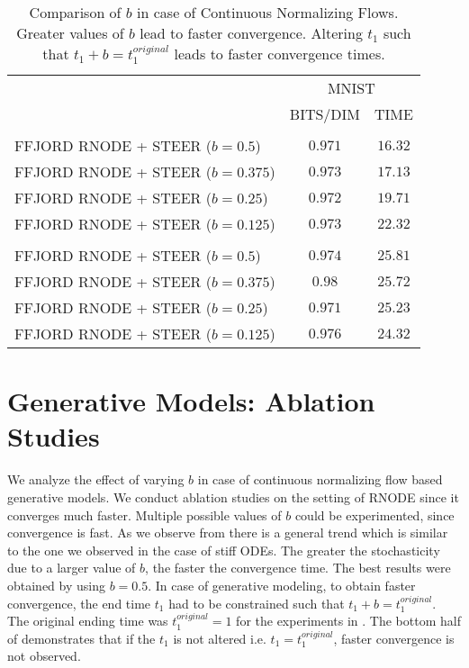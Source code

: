 \begin{table}[ht!]
	\centering
	\begin{tabular}{l c c }
		\toprule
		& \multicolumn{2}{c}{MNIST} \\
		& BITS/DIM & TIME \\
		\midrule
		\hdashline
		\multicolumn{3}{c}{$t_1:t_1+b=t_1^{original}=1$} \\
		\hdashline
		FFJORD RNODE + STEER ($b=0.5$) & $0.971$ & $16.32$ \\
		FFJORD RNODE + STEER ($b=0.375$) & $0.973$ & $17.13$  \\
		FFJORD RNODE + STEER ($b=0.25$) & $0.972$ & $19.71$  \\
		FFJORD RNODE + STEER ($b=0.125$) & $0.973$ & $22.32$  \\
		\hdashline
		\multicolumn{3}{c}{$t_1:t_1=t_1^{original}=1$} \\
		\hdashline
		FFJORD RNODE + STEER ($b=0.5$) & $0.974$ & $25.81$ \\
		FFJORD RNODE + STEER ($b=0.375$) & $0.98$ & $25.72$  \\
		FFJORD RNODE + STEER ($b=0.25$) & $0.971$ & $25.23$  \\
		FFJORD RNODE + STEER ($b=0.125$) & $0.976$ & $24.32$  \\
		\bottomrule %
	\end{tabular}
	\caption{Comparison of $b$ in case of Continuous Normalizing Flows. Greater values of $b$ lead to faster convergence. Altering $t_1$ such that $t_1+b=t_1^{original}$ leads to faster convergence times.}  %
	\label{tab:b_comparison_cnf_results}
\end{table}


\section{Generative Models: Ablation Studies}
We analyze the effect of varying $b$ in case of continuous normalizing flow based generative models. We conduct ablation studies on the setting of RNODE \cite{finlay2020train} since it converges much faster. Multiple possible values of $b$ could be experimented, since convergence is fast. 
As we observe from  there is a general trend which is similar to the one we observed in the case of stiff ODEs. The greater the stochasticity due to a larger value of $b$, the faster the convergence time. The best results were obtained by using $b=0.5$. In case of generative modeling, to obtain faster convergence, the end time $t_1$ had to be constrained such that $t_1+b=t_1^{original}$. The original ending time was $t_1^{original}=1$ for the experiments in .  The bottom half of   demonstrates that if the $t_1$ is not altered i.e. $t_1=t_1^{original}$, faster convergence is not observed. 